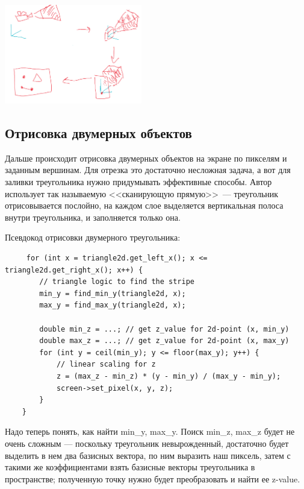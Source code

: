 \documentclass{article}
\begin{document}
\begin{center}
\includegraphics[width=6cm]{camera_pipeline.png}
\end{center}
\newpage
\subsection{Отрисовка двумерных объектов}
Дальше происходит отрисовка двумерных объектов на экране по пикселям и заданным вершинам. Для отрезка это достаточно несложная задача, а вот для заливки треугольника нужно придумывать эффективные способы. Автор использует так называемую <<сканирующую прямую>>~--- треугольник отрисовывается послойно, на каждом слое выделяется вертикальная полоса внутри треугольника, и заполняется только она.

Псевдокод отрисовки двумерного треугольника:

\begin{verbatim}
     for (int x = triangle2d.get_left_x(); x <= triangle2d.get_right_x(); x++) {
        // triangle logic to find the stripe
        min_y = find_min_y(triangle2d, x);
        max_y = find_max_y(triangle2d, x);

        double min_z = ...; // get z_value for 2d-point (x, min_y)
        double max_z = ...; // get z_value for 2d-point (x, max_y)
        for (int y = ceil(min_y); y <= floor(max_y); y++) {
        	// linear scaling for z
            z = (max_z - min_z) * (y - min_y) / (max_y - min_y);
            screen->set_pixel(x, y, z);
        }
    }
\end{verbatim}

Надо теперь понять, как найти min\_y, max\_y. Поиск min\_z, max\_z будет не очень сложным --- поскольку треугольник невырожденный, достаточно будет выделить в нем два базисных вектора, по ним выразить наш пиксель, затем с такими же коэффициентами взять базисные векторы треугольника в пространстве; полученную точку нужно будет преобразовать и найти ее z-value.
\end{document}
